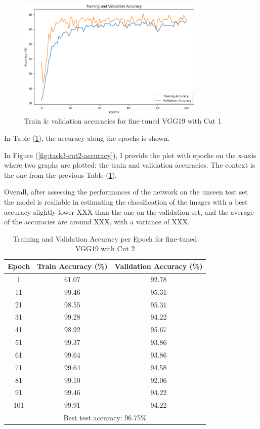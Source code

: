 \documentclass[11pt]{scrartcl}
\begin{document}
\begin{figure}[htbp]
\centering
\includegraphics[width=0.8\textwidth]{./figures/task3-cut1-accuracy.png}
\caption{Train \& validation accuracies for fine-tuned VGG19 with Cut 1}
\label{fig:task3-cut1-accuracy}
\end{figure}


In Table (\ref{tab:task3-cut2-accuracy}),
the accuracy along the epochs is shown.

In Figure (\ref{fig:task3-cut2-accuracy}), 
I provide the plot with epochs on the x-axis where two graphs are plotted:
the train and validation accuracies.
The context is the one from the previous Table (\ref{tab:task3-cut2-accuracy}). 

Overall, after assessing the performances of the network on the unseen test set
the model is realiable in estimating the classification of the images with
a best accuracy slightly lower XXX than the one on the validation set,
and the average of the accuracies are around XXX,
with a variance of XXX.

\begin{table}[htbp]
\centering
\caption{Training and Validation Accuracy per Epoch for fine-tuned VGG19 with Cut 2}
\begin{tabular}{ccc}
\toprule
\textbf{Epoch} & \textbf{Train Accuracy (\%)} & \textbf{Validation Accuracy (\%)} \\
\midrule
1    & 61.07 & 92.78 \\
11   & 99.46 & 95.31 \\
21   & 98.55 & 95.31 \\
31   & 99.28 & 94.22 \\
41   & 98.92 & 95.67 \\
51   & 99.37 & 93.86 \\
61   & 99.64 & 93.86 \\
71   & 99.64 & 94.58 \\
81   & 99.10 & 92.06 \\
91   & 99.46 & 94.22 \\
101  & 99.91 & 94.22 \\
\midrule
\multicolumn{3}{c}{Best test accuracy: 96.75\%} \\
\bottomrule
\end{tabular}
\label{tab:task3-cut2-accuracy}
\end{table}
\end{document}
